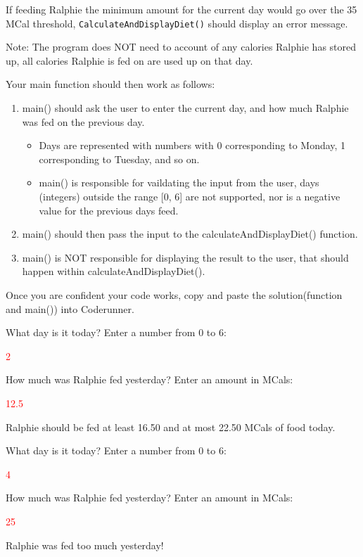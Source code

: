 If feeding Ralphie the minimum amount for the current day would go over the 35 MCal threshold, \texttt{CalculateAndDisplayDiet()} should display an error message.

Note: The program does NOT need to account of any calories Ralphie has stored up, all calories Ralphie is fed on are used up on that day.

Your main function should then work as follows:

\begin{enumerate}
    \item main() should ask the user to enter the current day, and how much Ralphie was fed on the previous day.
    \begin{itemize}
        \item Days are represented with numbers with 0 corresponding to Monday, 1 corresponding to Tuesday, and so on.
        \item main() is responsible for vaildating the input from the user, days (integers) outside the range [0, 6] are not supported, nor is a negative value for the previous days feed.
    \end{itemize}
    \item main() should then pass the input to the calculateAndDisplayDiet() function.
    \item main() is NOT responsible for displaying the result to the user, that should happen within calculateAndDisplayDiet().
    
\end{enumerate}

Once you are confident your code works, copy and paste the solution(function and main()) into Coderunner.

\begin{sample}
What day is it today? Enter a number from 0 to 6:

 \textcolor{red}{2}
 
How much was Ralphie fed yesterday? Enter an amount in MCals:

 \textcolor{red}{12.5}
 
Ralphie should be fed at least 16.50 and at most 22.50 MCals of food today.

\end{sample}

\begin{sample}
What day is it today? Enter a number from 0 to 6:

 \textcolor{red}{4}
 
How much was Ralphie fed yesterday? Enter an amount in MCals:

 \textcolor{red}{25}
 
Ralphie was fed too much yesterday!

\end{sample}

